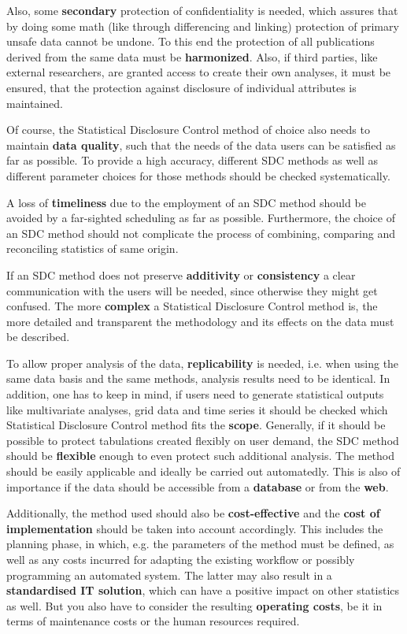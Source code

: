 Also, some \textbf{secondary} protection of confidentiality is needed, which assures that by doing some math (like through differencing and linking) protection of primary unsafe data cannot be undone. To this end the protection of all publications derived from the same data must be \textbf{harmonized}. Also, if third parties, like external researchers, are granted access to create their own analyses, it must be ensured, that the protection against disclosure of individual attributes is maintained.

Of course, the Statistical Disclosure Control method of choice also needs to maintain \textbf{data quality}, such that the needs of the data users can be satisfied as far as possible. To provide a high accuracy, different SDC methods as well as different parameter choices for those methods should be checked systematically.

A loss of \textbf{timeliness} due to the employment of an SDC method should be avoided by a far-sighted scheduling as far as possible. Furthermore, the choice of an SDC method should not complicate the process of combining, comparing and reconciling statistics of same origin.

If an SDC method does not preserve \textbf{additivity} or \textbf{consistency} a clear communication with the users will be needed, since otherwise they might get confused. The more \textbf{complex} a Statistical Disclosure Control method is, the more detailed and transparent the methodology and its effects on the data must be described.

To allow proper analysis of the data, \textbf{replicability} is needed, i.e. when using the same data basis and the same methods, analysis results need to be identical. In addition, one has to keep in mind, if users need to generate statistical outputs like multivariate analyses, grid data and time series it should be checked which Statistical Disclosure Control method fits the \textbf{scope}. Generally, if it should be possible to protect tabulations created flexibly on user demand, the SDC method should be \textbf{flexible} enough to even protect such additional analysis. The method should be easily applicable and ideally be carried out automatedly. This is also of importance if the data should be accessible from a \textbf{database} or from the \textbf{web}.

Additionally, the method used should also be \textbf{cost-effective} and the \textbf{cost of implementation} should be taken into account accordingly. This includes the planning phase, in which, e.g. the parameters of the method must be defined, as well as any costs incurred for adapting the existing workflow or possibly programming an automated system. The latter may also result in a \textbf{standardised IT solution}, which can have a positive impact on other statistics as well. But you also have to consider the resulting \textbf{operating costs}, be it in terms of maintenance costs or the human resources required.

